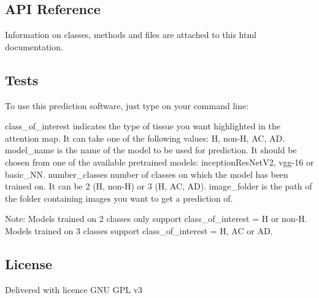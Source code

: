 \subsection*{A\+PI Reference}

Information on classes, methods and files are attached to this html documentation.

\subsection*{Tests}

To use this prediction software, just type on your command line\+:


\begin{DoxyCode}{0}
\end{DoxyCode}


class\+\_\+of\+\_\+interest indicates the type of tissue you want highlighted in the attention map. It can take one of the following values\+: H, non-\/H, AC, AD. model\+\_\+name is the name of the model to be used for prediction. It should be chosen from one of the available pretrained models\+: inception\+Res\+Net\+V2, vgg-\/16 or basic\+\_\+\+NN. number\+\_\+classes number of classes on which the model has been trained on. It can be 2 (H, non-\/H) or 3 (H, AC, AD). image\+\_\+folder is the path of the folder containing images you want to get a prediction of.

Note\+: Models trained on 2 classes only support class\+\_\+of\+\_\+interest = H or non-\/H. Models trained on 3 classes support class\+\_\+of\+\_\+interest = H, AC or AD.

\subsection*{License}

Delivered with licence G\+NU G\+PL v3 